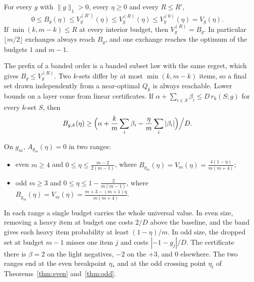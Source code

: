 \begin{proposition}
\label{prop:sandwich}
For every $g$ with $\|g\|_1>0$, every $\eta\ge0$ and every $R\le R'$,
\[
0\le B_{g}(\eta)\le V^{(R')}_{g}(\eta)\le V^{(R)}_{g}(\eta)\le V^{(0)}_{g}(\eta)=V_{g}(\eta).
\]
If $\min(k,m-k)\le R$ at every interior budget, then $V^{(R)}_{g}=B_{g}$. In particular
$\lfloor m/2\rfloor$ exchanges always reach $B_{g}$, and one exchange reaches the optimum of the
budgets $1$ and $m-1$.
\end{proposition}

The prefix of a banded order is a banded subset law with the same regret, which gives
$B_g\le V^{(R)}_g$. Two $k$-sets differ by at most $\min(k,m-k)$ items, so a final set drawn
independently from a near-optimal $Q_{k}$ is always reachable. Lower bounds on a layer come
from linear certificates. If $\alpha+\sum_{i\in S}\beta_{i}\le D\,r_{k}(S;g)$ for every $k$-set
$S$, then
\[
B_{g,k}(\eta)\ge\Bigl(\alpha+\frac km\sum_{i}\beta_{i}-\frac\eta m\sum_{i}|\beta_{i}|\Bigr)\Big/D.
\]

\begin{theorem}
\label{thm:zerovalue}
On $g_{m}$, $A_{g_m}(\eta)=0$ in two ranges:
\begin{itemize}
\item even $m\ge4$ and $0\le\eta\le\frac{m-2}{2(m-1)}$, where
$B_{g_m}(\eta)=V_{m}(\eta)=\frac{4(1-\eta)}{m(m+4)}$;
\item odd $m\ge3$ and $0\le\eta\le1-\frac{2}{m(m-1)}$, where
$B_{g_m}(\eta)=V_{m}(\eta)=\frac{m+3-(m+1)\eta}{m(m+4)}$.
\end{itemize}
\end{theorem}

In each range a single budget carries the whole universal value. In even size, removing a heavy
item at budget one costs $2/D$ above the baseline, and the band gives each heavy item
probability at least $(1-\eta)/m$. In odd size, the dropped set at budget $m-1$ misses one item
$j$ and costs $|-1-g_{j}|/D$. The certificate there is $\beta=2$ on the light negatives, $-2$ on
the $+3$, and $0$ elsewhere. The two ranges end at the even breakpoint $\eta_*$ and at the odd
crossing point $\eta_t$ of Theorems~\ref{thm:even} and~\ref{thm:odd}.

